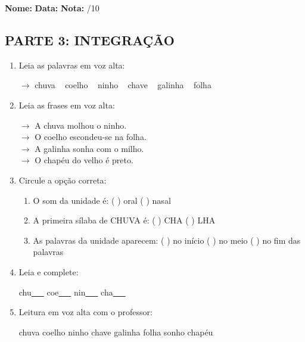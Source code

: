 \begin{exercicio}

\noindent\textbf{Nome:} \underline{\hspace{3.2cm}} \quad \textbf{Data:} \underline{\hspace{1.6cm}} \quad \textbf{Nota:} \underline{\hspace{0.9cm}}/10


\subsection*{PARTE 3: INTEGRAÇÃO}

\begin{enumerate}[resume]

  \item Leia as palavras em voz alta:
  \begin{center}
  $\rightarrow$ chuva ~ coelho ~ ninho ~ chave ~ galinha ~ folha
  \end{center}

  \item Leia as frases em voz alta:
  \begin{center}
  $\rightarrow$ A chuva molhou o ninho.\\
  $\rightarrow$ O coelho escondeu-se na folha.\\
  $\rightarrow$ A galinha sonha com o milho.\\
  $\rightarrow$ O chapéu do velho é preto.\\
  \end{center}

  \item Circule a opção correta:
  \begin{enumerate}[label=(\alph*)]

    \item O som da unidade é: ( ) oral ( ) nasal 

    \item A primeira sílaba de CHUVA é: ( ) CHA ( ) LHA

    \item As palavras da unidade aparecem: ( ) no início ( ) no meio ( ) no fim das palavras

  \end{enumerate}

  \item Leia e complete:
  \begin{center}
  chu\underline{~~~} \quad coe\underline{~~~} \quad nin\underline{~~~} \quad cha\underline{~~~}
  \end{center}

  \item Leitura em voz alta com o professor:
  \begin{center}
  chuva \quad coelho \quad ninho \quad chave \quad galinha \quad folha \quad sonho \quad chapéu
  \end{center}

\end{enumerate}

\end{exercicio}

